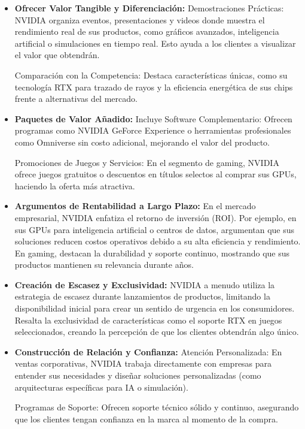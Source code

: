 \documentclass{article}
\begin{document}
\begin{itemize}
  \item \textbf{Ofrecer Valor Tangible y Diferenciación:} Demostraciones Prácticas: NVIDIA organiza eventos, presentaciones y videos donde muestra el rendimiento real de sus productos, como gráficos avanzados, inteligencia artificial o simulaciones en tiempo real. Esto ayuda a los clientes a visualizar el valor que obtendrán. 

  Comparación con la Competencia: Destaca características únicas, como su tecnología RTX para trazado de rayos y la eficiencia energética de sus chips frente a alternativas del mercado. 

  \item \textbf{Paquetes de Valor Añadido:} Incluye Software Complementario: Ofrecen programas como NVIDIA GeForce Experience o herramientas profesionales como Omniverse sin costo adicional, mejorando el valor del producto. 

  Promociones de Juegos y Servicios: En el segmento de gaming, NVIDIA ofrece juegos gratuitos o descuentos en títulos selectos al comprar sus GPUs, haciendo la oferta más atractiva. 

  \item \textbf{Argumentos de Rentabilidad a Largo Plazo:} En el mercado empresarial, NVIDIA enfatiza el retorno de inversión (ROI). Por ejemplo, en sus GPUs para inteligencia artificial o centros de datos, argumentan que sus soluciones reducen costos operativos debido a su alta eficiencia y rendimiento.  
  En gaming, destacan la durabilidad y soporte continuo, mostrando que sus productos mantienen su relevancia durante años. 

  \item \textbf{Creación de Escasez y Exclusividad:} NVIDIA a menudo utiliza la estrategia de escasez durante lanzamientos de productos, limitando la disponibilidad inicial para crear un sentido de urgencia en los consumidores. 
  Resalta la exclusividad de características como el soporte RTX en juegos seleccionados, creando la percepción de que los clientes obtendrán algo único. 
  
  \item \textbf{Construcción de Relación y Confianza:} Atención Personalizada: En ventas corporativas, NVIDIA trabaja directamente con empresas para entender sus necesidades y diseñar soluciones personalizadas (como arquitecturas específicas para IA o simulación). 

  Programas de Soporte: Ofrecen soporte técnico sólido y continuo, asegurando que los clientes tengan confianza en la marca al momento de la compra. 
  

\end{itemize}
\end{document}
